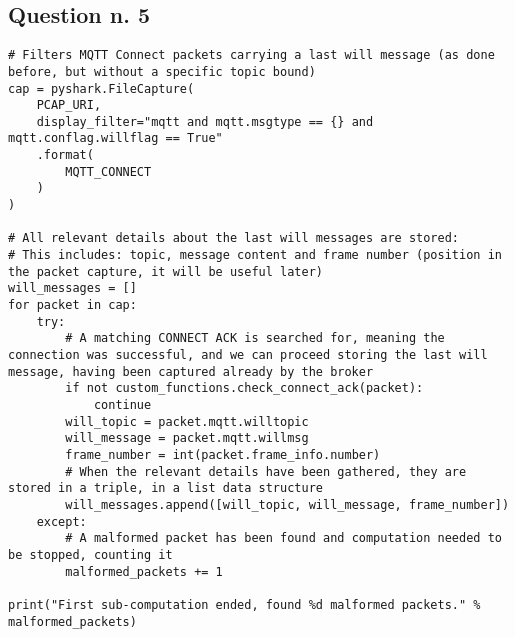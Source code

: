 \documentclass[a4paper,11pt]{article} %
\begin{document}
    \subsection{Question n. 5}\label{subsec:question-n.-5}

    \begin{verbatim}
# Filters MQTT Connect packets carrying a last will message (as done before, but without a specific topic bound)
cap = pyshark.FileCapture(
    PCAP_URI,
    display_filter="mqtt and mqtt.msgtype == {} and mqtt.conflag.willflag == True"
    .format(
        MQTT_CONNECT
    )
)

# All relevant details about the last will messages are stored:
# This includes: topic, message content and frame number (position in the packet capture, it will be useful later)
will_messages = []
for packet in cap:
    try:
        # A matching CONNECT ACK is searched for, meaning the connection was successful, and we can proceed storing the last will message, having been captured already by the broker
        if not custom_functions.check_connect_ack(packet):
            continue
        will_topic = packet.mqtt.willtopic
        will_message = packet.mqtt.willmsg
        frame_number = int(packet.frame_info.number)
        # When the relevant details have been gathered, they are stored in a triple, in a list data structure
        will_messages.append([will_topic, will_message, frame_number])
    except:
        # A malformed packet has been found and computation needed to be stopped, counting it
        malformed_packets += 1

print("First sub-computation ended, found %d malformed packets." % malformed_packets)
    \end{verbatim}
\end{document}
